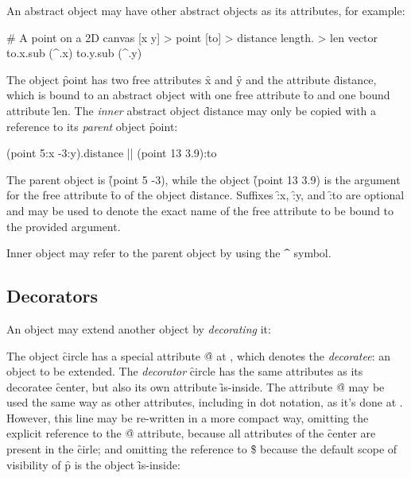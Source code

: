 An abstract object may have other abstract objects as its attributes,
for example:

\begin{eocode}
# A point on a 2D canvas
[x y] > point
  [to] > distance
    length. > len
      vector
        to.x.sub (^.x)
        to.y.sub (^.y)
\end{eocode}

The object \f{point} has two free attributes \f{x} and \f{y}
and the attribute \f{distance}, which is bound to an abstract
object with one free attribute \f{to} and one bound attribute \f{len}.
The \emph{inner} abstract object \f{distance} may only be copied
with a reference to its \emph{parent} object \f{point}:

\begin{eocode}
(point 5:x -3:y).distance |$\label{ln:point-copy}$|
  (point 13 3.9):to
\end{eocode}

The parent object is \f{(point 5 -3)}, while the object \f{(point 13 3.9)}
is the argument for the free attribute \f{to} of the object \f{distance}.
Suffixes \f{:x}, \f{:y}, and \f{:to} are optional and may be used
to denote the exact name of the free attribute to be bound to the
provided argument.

Inner object may refer to the parent object by using the \f{\^{}} symbol.

\subsection{Decorators}

An object may extend another object by \emph{decorating} it:


The object \f{circle} has a special attribute \f{@}
at , which denotes
the \emph{decoratee}: an object to be extended. The \emph{decorator} \f{circle}
has the same attributes as its decoratee \f{center}, but also
its own attribute \f{is-inside}. The attribute \f{@} may be used
the same way as other attributes, including in dot notation, as it's done
at . However, this line
may be re-written in a more compact way, omitting the explicit
reference to the \f{@} attribute, because all attributes
of the \f{center} are present in the \f{cirle};
and omitting the reference to \f{\$} because the default scope of visibility of
\f{p} is the object \f{is-inside}:

